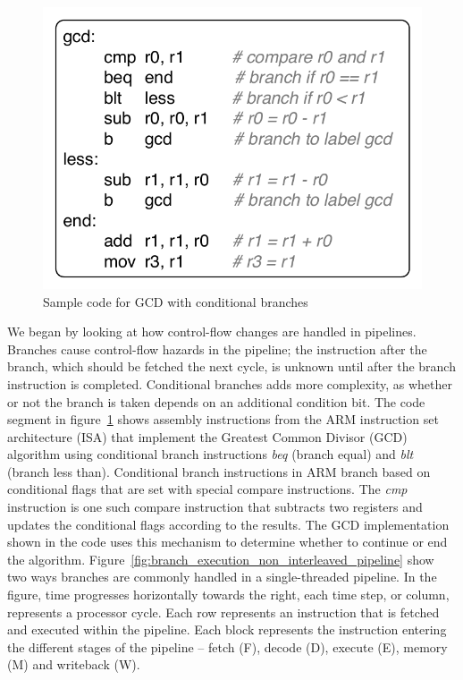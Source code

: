   
\begin{figure}
  \vspace{-20pt}
  \begin{center}
    \includegraphics[scale=.65]{figs/sample_gcd_code}
  \end{center}
  \vspace{-20pt}
  \caption{Sample code for GCD with conditional branches}
  \label{fig:sample_gcd_code}
\end{figure}
We began by looking at how control-flow changes are handled in pipelines.
Branches cause control-flow hazards in the pipeline; the instruction after the branch, which should be fetched the next cycle, is unknown until after the branch instruction is completed.
Conditional branches adds more complexity, as whether or not the branch is taken depends on an additional condition bit. 
The code segment in figure~\ref{fig:sample_gcd_code} shows assembly instructions from the ARM instruction set architecture (ISA) that implement the Greatest Common Divisor (GCD) algorithm using conditional branch instructions \emph{beq} (branch equal) and \emph{blt} (branch less than).  
Conditional branch instructions in ARM branch based on conditional flags that are set with special compare instructions.
The \emph{cmp} instruction is one such compare instruction that subtracts two registers and updates the conditional flags according to the results.
The GCD implementation shown in the code uses this mechanism to determine whether to continue or end the algorithm.
Figure~\ref{fig:branch_execution_non_interleaved_pipeline} show two ways branches are commonly handled in a single-threaded pipeline. 
In the figure, time progresses horizontally towards the right, each time step, or column, represents a processor cycle.
Each row represents an instruction that is fetched and executed within the pipeline.
Each block represents the instruction entering the different stages of the pipeline -- fetch (F), decode (D), execute (E), memory (M) and writeback (W).   


